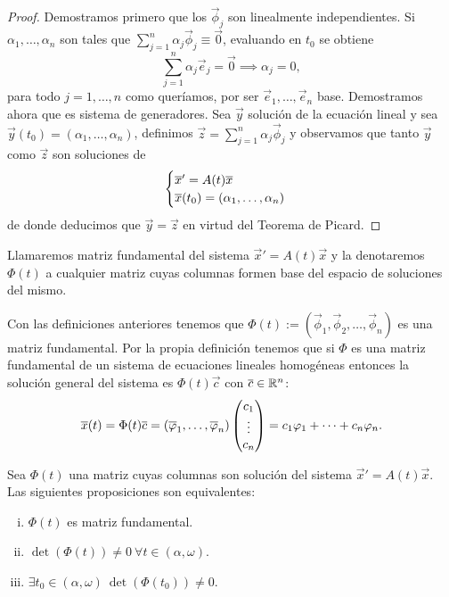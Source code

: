 \documentclass[../ecuaciones_diferenciales.tex]{subfiles}
\begin{document}
\begin{proof}
	Demostramos primero que los \(\vec{\phi}_j\) son linealmente independientes. 
	Si \(\alpha_1, \dots, \alpha_n\) son tales que 
	\(\sum_{j = 1}^n \alpha_j \vec{\phi}_j \equiv \vec{0}\),
	evaluando en \(t_0\) se obtiene
	\[\sum_{j = 1}^n \alpha_j \vec{e}_j = \vec{0} \implies \alpha_j = 0,\]
	para todo \(j = 1, \dots, n\) como queríamos, por ser 
	\(\vec{e}_1, \dots, \vec{e}_n\) base. 
	Demostramos ahora que es sistema de generadores. Sea \(\vec{y}\) solución
	de la ecuación lineal y sea 
	\(\vec{y}(t_0) = (\alpha_1, \dots, \alpha_n)\),
	definimos \(\vec{z} = \sum_{j = 1}^n \alpha_j \vec{\phi}_j\) y observamos 
	que tanto \(\vec{y}\) como \(\vec{z}\) son soluciones de
	\[\begin{cases}
		\overline{x}' = A(t)\overline{x} \\
		\overline{x}(t_0) = (\alpha_1, \dots, \alpha_n)\end{cases}\]
	de donde deducimos que \(\vec{y} = \vec{z}\) en virtud del 
	Teorema de Picard.
\end{proof}

\begin{definition}
	Llamaremos matriz fundamental del sistema 
	\(\vec{x}' = A(t)\vec{x}\) y la denotaremos
	\(\Phi(t)\) a cualquier matriz cuyas columnas formen base del espacio de
	soluciones del mismo.
\end{definition}

Con las definiciones anteriores tenemos que
\(\Phi(t) := (\vec{\phi}_1, \vec{\phi}_2, \dots, \vec{\phi}_n)\) es una matriz 
fundamental. Por la propia definición tenemos que si \(\Phi\) es una matriz 
fundamental de un sistema de ecuaciones lineales homogéneas entonces la solución 
general del sistema es \(\Phi(t)\vec{c}\) con \(\overline{c} \in \mathbb{R}^n\):
\[\overline{x}(t) = \Phi(t) \overline{c} 
	= (\overline{\varphi}_1, \dots, \overline{\varphi}_n) \begin{pmatrix}c_1 \\ \vdots \\ c_n\end{pmatrix} =
	c_1\varphi_1 + \cdots + c_n\varphi_n.\]

\begin{corollary}
	Sea \(\Phi(t)\) una matriz cuyas columnas son solución del sistema
	\(\vec{x}' = A(t)\vec{x}\). Las siguientes proposiciones son equivalentes:
	\begin{multicols}{2}
	\begin{enumerate}[i)]
		\item \(\Phi(t)\) es matriz fundamental.

		\item \(\det(\Phi(t)) \neq 0 \ \forall t \in (\alpha, \omega)\).

		\item \(\exists t_0 \in (\alpha, \omega) \ \det(\Phi(t_0)) \neq 0\).
	\end{enumerate}
	\end{multicols}
\end{corollary}
\end{document}
